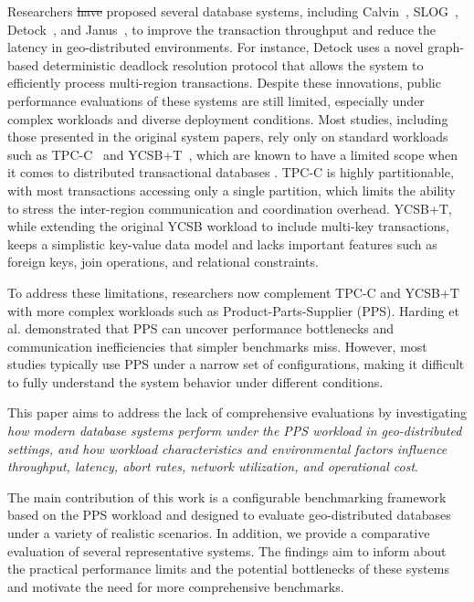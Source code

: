 \documentclass{article}
\providecommand{\DIFaddtex}[1]{{\protect\color{blue}\uwave{#1}}} %
\providecommand{\DIFdeltex}[1]{{\protect\color{red}\sout{#1}}}                      %
\providecommand{\DIFaddbegin}{} %
\providecommand{\DIFaddend}{} %
\providecommand{\DIFdelbegin}{} %
\providecommand{\DIFdelend}{} %
\providecommand{\DIFadd}[1]{\texorpdfstring{\DIFaddtex{#1}}{#1}} %
\providecommand{\DIFdel}[1]{\texorpdfstring{\DIFdeltex{#1}}{}} %
\newcommand{\DIFscaledelfig}{0.5}
\newlength{\DIFdelgraphicswidth} %
\newlength{\DIFdelgraphicsheight} %
\newcommand{\DIFaddincludegraphics}[2][]{{\color{blue}\fbox{\DIFOincludegraphics[#1]{#2}}}} %
\newcommand{\DIFdelincludegraphics}[2][]{%
\sbox{\DIFdelgraphicsbox}{\DIFOincludegraphics[#1]{#2}}%
\settoboxwidth{\DIFdelgraphicswidth}{\DIFdelgraphicsbox} %
\settoboxtotalheight{\DIFdelgraphicsheight}{\DIFdelgraphicsbox} %
\scalebox{\DIFscaledelfig}{%
\parbox[b]{\DIFdelgraphicswidth}{\usebox{\DIFdelgraphicsbox}\\[-\baselineskip] \rule{\DIFdelgraphicswidth}{0em}}\llap{\resizebox{\DIFdelgraphicswidth}{\DIFdelgraphicsheight}{%
\setlength{\unitlength}{\DIFdelgraphicswidth}%
\begin{picture}(1,1)%
\thicklines\linethickness{2pt} %
{\color[rgb]{1,0,0}\put(0,0){\framebox(1,1){}}}%
{\color[rgb]{1,0,0}\put(0,0){\line( 1,1){1}}}%
{\color[rgb]{1,0,0}\put(0,1){\line(1,-1){1}}}%
\end{picture}%
}\hspace*{3pt}}} %
} %
\DeclareRobustCommand{\DIFaddbegin}{\DIFOaddbegin \let\includegraphics\DIFaddincludegraphics} %
\DeclareRobustCommand{\DIFaddend}{\DIFOaddend \let\includegraphics\DIFOincludegraphics} %
\DeclareRobustCommand{\DIFdelbegin}{\DIFOdelbegin \let\includegraphics\DIFdelincludegraphics} %
\DeclareRobustCommand{\DIFdelend}{\DIFOaddend \let\includegraphics\DIFOincludegraphics} %
\begin{document}
Researchers \DIFdelbegin \DIFdel{have }\DIFdelend \DIFaddbegin \DIFadd{hedffewffwefweave }\DIFaddend proposed several database systems, including Calvin~\cite{thomson2012calvin}, SLOG~\cite{ren2019slog}, Detock~\cite{nguyen2023detock}, and Janus~\cite {mu2016consolidating}, to improve the transaction throughput and reduce the latency in geo-distributed environments. For instance, Detock uses a novel graph-based deterministic deadlock resolution protocol that allows the system to efficiently process multi-region transactions. Despite these innovations, public performance evaluations of these systems are still limited, especially under complex workloads and diverse deployment conditions. Most studies, including those presented in the original system papers, rely only on standard workloads such as TPC-C~\cite{leutenegger1993modeling} and YCSB+T~\cite{dey2014ycsb+}, which are known to have a limited scope when it comes to distributed transactional databases \cite{qu2022current}. TPC-C is highly partitionable, with most transactions accessing only a single partition, which limits the ability to stress the inter-region communication and coordination overhead. YCSB+T, while extending the original YCSB workload to include multi-key transactions, keeps a simplistic key-value data model and lacks important features such as foreign keys, join operations, and relational constraints.

To address these limitations, researchers now complement TPC-C and YCSB+T with more complex workloads such as Product-Parts-Supplier (PPS). Harding et al.\cite{harding2017evaluation} demonstrated that PPS can uncover performance bottlenecks and communication inefficiencies that simpler benchmarks miss. However, most studies typically use PPS under a narrow set of configurations, making it difficult to fully understand the system behavior under different conditions.

This paper aims to address the lack of comprehensive evaluations by investigating \textit{how modern database systems perform under the PPS workload in geo-distributed settings, and how workload characteristics and environmental factors influence throughput, latency, abort rates, network utilization, and operational cost}.

The main contribution of this work is a configurable benchmarking framework based on the PPS workload and designed to evaluate geo-distributed databases under a variety of realistic scenarios. In addition, we provide a comparative evaluation of several representative systems. The findings aim to inform about the practical performance limits and the potential bottlenecks of these systems and motivate the need for more comprehensive benchmarks.
\end{document}
